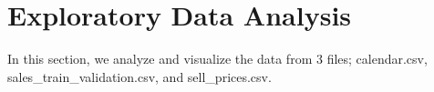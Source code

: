 \documentclass[12pt]{article}
\begin{document}



\section{Exploratory Data Analysis}
In this section, we analyze and visualize the data from 3 files; calendar.csv, \\ sales_train_validation.csv, and sell_prices.csv.
\end{document}
